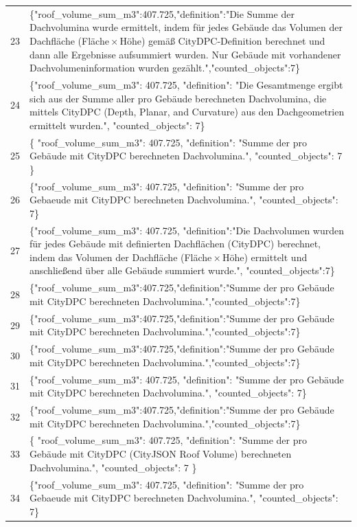 \documentclass[a4paper,11pt]{article}
\begin{document}
\begin{table}[ht]
\begin{tabular}{r p{12cm}}
23 & \{"roof\_volume\_sum\_m3":407.725,"definition":"Die Summe der Dachvolumina wurde ermittelt, indem für jedes Gebäude das Volumen der Dachfläche (Fläche × Höhe) gemäß CityDPC‑Definition berechnet und dann alle Ergebnisse aufsummiert wurden. Nur Gebäude mit vorhandener Dachvolumeninformation wurden gezählt.","counted\_objects":7\} \\
24 & \{"roof\_volume\_sum\_m3": 407.725, "definition": "Die Gesamtmenge ergibt sich aus der Summe aller pro Gebäude berechneten Dachvolumina, die mittels CityDPC (Depth, Planar, and Curvature) aus den Dachgeometrien ermittelt wurden.", "counted\_objects": 7\} \\
25 & \{
  "roof\_volume\_sum\_m3": 407.725,
  "definition": "Summe der pro Gebäude mit CityDPC berechneten Dachvolumina.",
  "counted\_objects": 7
\} \\
26 & \{"roof\_volume\_sum\_m3": 407.725, "definition": "Summe der pro Gebaeude mit CityDPC berechneten Dachvolumina.", "counted\_objects": 7\} \\
27 & \{"roof\_volume\_sum\_m3": 407.725, "definition":"Die Dachvolumen wurden für jedes Gebäude mit definierten Dachflächen (CityDPC) berechnet, indem das Volumen der Dachfläche (Fläche × Höhe) ermittelt und anschließend über alle Gebäude summiert wurde.", "counted\_objects":7\} \\
28 & \{"roof\_volume\_sum\_m3":407.725,"definition":"Summe der pro Gebäude mit CityDPC berechneten Dachvolumina.","counted\_objects":7\} \\
29 & \{"roof\_volume\_sum\_m3":407.725,"definition":"Summe der pro Gebäude mit CityDPC berechneten Dachvolumina.","counted\_objects":7\} \\
30 & \{"roof\_volume\_sum\_m3":407.725,"definition":"Summe der pro Gebäude mit CityDPC berechneten Dachvolumina.","counted\_objects":7\} \\
31 & \{"roof\_volume\_sum\_m3": 407.725, "definition": "Summe der pro Gebäude mit CityDPC berechneten Dachvolumina.", "counted\_objects": 7\} \\
32 & \{"roof\_volume\_sum\_m3":407.725,"definition":"Summe der pro Gebäude mit CityDPC berechneten Dachvolumina.","counted\_objects":7\} \\
33 & \{
  "roof\_volume\_sum\_m3": 407.725,
  "definition": "Summe der pro Gebäude mit CityDPC (CityJSON Roof Volume) berechneten Dachvolumina.",
  "counted\_objects": 7
\} \\
34 & \{"roof\_volume\_sum\_m3": 407.725, "definition": "Summe der pro Gebaeude mit CityDPC berechneten Dachvolumina.", "counted\_objects": 7\} \\

\end{tabular}
\end{table}
\end{document}

